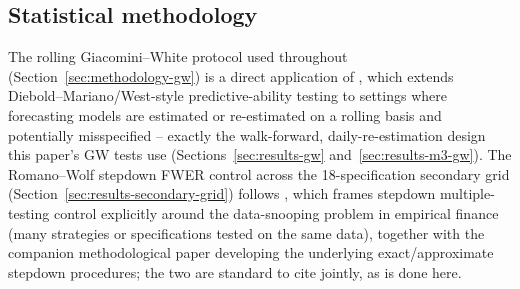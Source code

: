 \subsection{Statistical methodology}
\label{sec:rw-methodology}

The rolling Giacomini--White protocol used throughout
(Section~\ref{sec:methodology-gw}) is a direct application of
\citet{giacomini2006tests}, which extends Diebold--Mariano/West-style
predictive-ability testing to settings where forecasting models are
estimated or re-estimated on a rolling basis and potentially
misspecified -- exactly the walk-forward, daily-re-estimation design this
paper's GW tests use (Sections~\ref{sec:results-gw}
and~\ref{sec:results-m3-gw}). The Romano--Wolf stepdown FWER control
across the 18-specification secondary grid
(Section~\ref{sec:results-secondary-grid}) follows
\citet{romano2005stepwise}, which frames stepdown multiple-testing
control explicitly around the data-snooping problem in empirical finance
(many strategies or specifications tested on the same data), together
with the companion methodological paper \citet{romano2005exact}
developing the underlying exact/approximate stepdown procedures; the two
are standard to cite jointly, as is done here.
